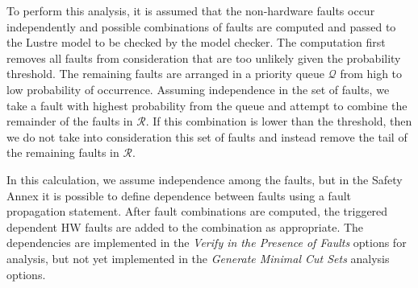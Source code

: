To perform this analysis, it is assumed that the non-hardware faults occur independently and possible combinations of faults are computed and passed to the Lustre model to be checked by the model checker. %
The computation first removes all faults from consideration that are too unlikely given the probability threshold. The remaining faults are arranged in a priority queue $\mathcal{Q}$ from high to low probability of occurrence. Assuming independence in the set of faults, we take a fault with highest probability from the queue %
and attempt to combine the remainder of the faults in $\mathcal{R}$. %
If this combination is lower than the threshold, %
then we do not take into consideration this set of faults and instead remove the tail of the remaining faults in $\mathcal{R}$. 
 

In this calculation, we assume independence among the faults, but in the Safety Annex it is possible to define dependence between faults using a fault propagation statement. After fault combinations are computed, 
the triggered dependent HW faults are added to the combination as appropriate. The dependencies are implemented in the \textit{Verify in the Presence of Faults} options for analysis, but not yet implemented in the \textit{Generate Minimal Cut Sets} analysis options.

